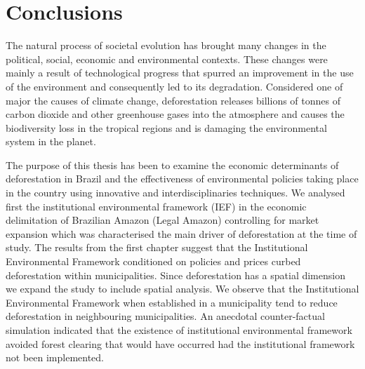 
\chapter*{Conclusions}  %

\ifpdf
    \graphicspath{{Conclusion/Figs/}{Conclusion/}}
\else
    \graphicspath{{Conclusion/Figs/}{Conclusion/}}
\fi

The natural process of societal evolution has brought many changes in the political, social, economic and environmental contexts. These changes were mainly a result of technological progress that spurred an improvement in the use of the environment and consequently led to its degradation. Considered one of major the causes of climate change, deforestation releases billions of tonnes of carbon dioxide and other greenhouse gases into the atmosphere and causes the biodiversity loss in the tropical regions and is damaging the environmental system in the planet.

The purpose of this thesis has been to examine the economic determinants of deforestation in Brazil and the effectiveness of environmental policies taking place in the country using innovative and interdisciplinaries techniques. We analysed first the institutional environmental framework (IEF) in the economic delimitation of Brazilian Amazon (Legal Amazon) controlling for market expansion which was characterised the main driver of deforestation at the time of study. The results from the first chapter suggest that the Institutional Environmental Framework conditioned on policies and prices curbed deforestation within municipalities. Since deforestation has a spatial dimension we expand the study to include spatial analysis. We observe that the Institutional Environmental Framework when established in a municipality tend to reduce deforestation in neighbouring municipalities. An anecdotal counter-factual simulation indicated that the existence of institutional environmental framework avoided forest clearing that would have occurred had the institutional framework not been implemented. 


